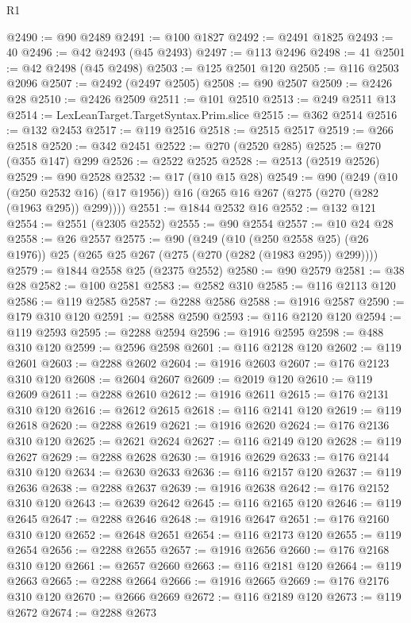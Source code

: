 \begin{lexlean}{R1}
\begin{coremodule}
@2490 := @90 @2489
@2491 := @100 @1827
@2492 := @2491 @1825
@2493 := 40
@2496 := @42 @2493 (@45 @2493)
@2497 := @113 @2496
@2498 := 41
@2501 := @42 @2498 (@45 @2498)
@2503 := @125 @2501 @120
@2505 := @116 @2503 @2096
@2507 := @2492 (@2497 @2505)
@2508 := @90 @2507
@2509 := @2426 @28
@2510 := @2426 @2509
@2511 := @101 @2510
@2513 := @249 @2511 @13
@2514 := LexLeanTarget.TargetSyntax.Prim.slice
@2515 := @362 @2514
@2516 := @132 @2453
@2517 := @119 @2516
@2518 := @2515 @2517
@2519 := @266 @2518
@2520 := @342 @2451
@2522 := @270 (@2520 @285)
@2525 := @270 (@355 @147) @299
@2526 := @2522 @2525
@2528 := @2513 (@2519 @2526)
@2529 := @90 @2528
@2532 := @17 (@10 @15 @28)
@2549 := @90
    (@249
      (@10 (@250 @2532 @16) (@17 @1956))
      @16
      (@265 @16 @267 (@275 (@270 (@282 (@1963 @295)) @299))))
@2551 := @1844 @2532 @16
@2552 := @132 @121
@2554 := @2551 (@2305 @2552)
@2555 := @90 @2554
@2557 := @10 @24 @28
@2558 := @26 @2557
@2575 := @90
    (@249
      (@10 (@250 @2558 @25) (@26 @1976))
      @25
      (@265 @25 @267 (@275 (@270 (@282 (@1983 @295)) @299))))
@2579 := @1844 @2558 @25 (@2375 @2552)
@2580 := @90 @2579
@2581 := @38 @28
@2582 := @100 @2581
@2583 := @2582 @310
@2585 := @116 @2113 @120
@2586 := @119 @2585
@2587 := @2288 @2586
@2588 := @1916 @2587
@2590 := @179 @310 @120
@2591 := @2588 @2590
@2593 := @116 @2120 @120
@2594 := @119 @2593
@2595 := @2288 @2594
@2596 := @1916 @2595
@2598 := @488 @310 @120
@2599 := @2596 @2598
@2601 := @116 @2128 @120
@2602 := @119 @2601
@2603 := @2288 @2602
@2604 := @1916 @2603
@2607 := @176 @2123 @310 @120
@2608 := @2604 @2607
@2609 := @2019 @120
@2610 := @119 @2609
@2611 := @2288 @2610
@2612 := @1916 @2611
@2615 := @176 @2131 @310 @120
@2616 := @2612 @2615
@2618 := @116 @2141 @120
@2619 := @119 @2618
@2620 := @2288 @2619
@2621 := @1916 @2620
@2624 := @176 @2136 @310 @120
@2625 := @2621 @2624
@2627 := @116 @2149 @120
@2628 := @119 @2627
@2629 := @2288 @2628
@2630 := @1916 @2629
@2633 := @176 @2144 @310 @120
@2634 := @2630 @2633
@2636 := @116 @2157 @120
@2637 := @119 @2636
@2638 := @2288 @2637
@2639 := @1916 @2638
@2642 := @176 @2152 @310 @120
@2643 := @2639 @2642
@2645 := @116 @2165 @120
@2646 := @119 @2645
@2647 := @2288 @2646
@2648 := @1916 @2647
@2651 := @176 @2160 @310 @120
@2652 := @2648 @2651
@2654 := @116 @2173 @120
@2655 := @119 @2654
@2656 := @2288 @2655
@2657 := @1916 @2656
@2660 := @176 @2168 @310 @120
@2661 := @2657 @2660
@2663 := @116 @2181 @120
@2664 := @119 @2663
@2665 := @2288 @2664
@2666 := @1916 @2665
@2669 := @176 @2176 @310 @120
@2670 := @2666 @2669
@2672 := @116 @2189 @120
@2673 := @119 @2672
@2674 := @2288 @2673

\end{coremodule}
\end{lexlean}
